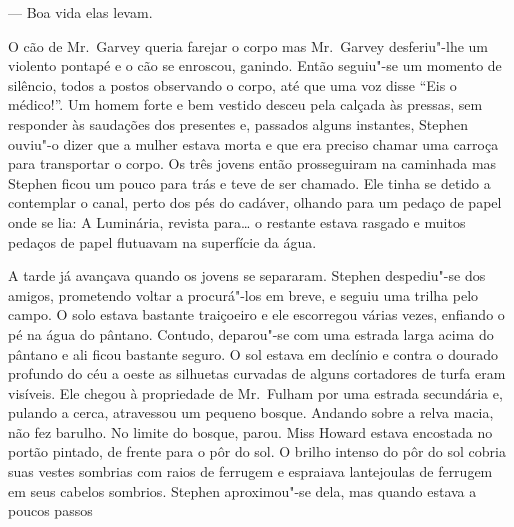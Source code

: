 --- Boa vida elas levam.

O cão de Mr.~Garvey queria farejar o corpo mas Mr.~Garvey
desferiu"-lhe um violento pontapé e o cão se enroscou, ganindo.  Então
seguiu"-se um momento de silêncio, todos a postos observando o corpo,
até que uma voz disse “Eis o médico!”.  Um homem forte e bem vestido
desceu pela calçada às pressas, sem responder às saudações dos
presentes e, passados alguns instantes, Stephen ouviu"-o dizer que a
mulher estava morta e que era preciso chamar uma carroça para
transportar o corpo.  Os três jovens então prosseguiram na caminhada
mas Stephen ficou um pouco para trás e teve de ser chamado.  Ele tinha
se detido a contemplar o canal, perto dos pés do cadáver, olhando para
um pedaço de papel onde se lia: A Luminária, revista para\ldots{} o restante
estava rasgado e muitos pedaços de papel flutuavam na superfície da
água.

A tarde já avançava quando os jovens se separaram.  Stephen
despediu"-se dos amigos, prometendo voltar a procurá"-los em breve, e
seguiu uma trilha pelo campo.  O solo estava bastante traiçoeiro e ele
escorregou várias vezes, enfiando o pé na água do pântano.  Contudo,
deparou"-se com uma estrada larga acima do pântano e ali ficou bastante
seguro.  O sol estava em declínio e contra o dourado profundo do céu a
oeste as silhuetas curvadas de alguns cortadores de turfa eram
visíveis.  Ele chegou à propriedade de Mr.~Fulham por uma estrada
secundária e, pulando a cerca, atravessou um pequeno bosque.  Andando
sobre a relva macia, não fez barulho.  No limite do bosque, parou. 
Miss Howard estava encostada no portão pintado, de frente para o
pôr do sol.  O brilho intenso do pôr do sol cobria suas vestes sombrias
com raios de ferrugem e espraiava lantejoulas de ferrugem em seus
cabelos sombrios.  Stephen aproximou"-se dela, mas quando estava a
poucos passos


\bigskip

{
\par}

